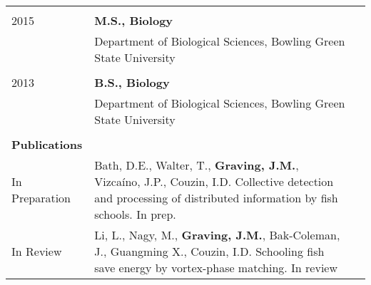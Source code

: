 \documentclass[letterpaper,6pt,oneside]{article}
\begin{document}
\begin{small}
\begin{longtable}{@{} l p{5.3in}l}
     & \\
 \large{2015} 
  & \textbf{M.S., Biology} \\
     & {Department of Biological Sciences, Bowling Green State University} \\
    
     & \\
 \large{2013} 
  &\textbf{B.S., Biology} \\
      & {Department of Biological Sciences, Bowling Green State University} \\
    
     & \\
 \Large{\textbf{Publications}}  \vspace{5mm} \\
\large{In Preparation}
& Bath, D.E., Walter, T., \textbf{Graving, J.M.}, Vizcaíno, J.P., Couzin, I.D. Collective detection and processing of distributed information by fish schools. In prep. \vspace{1mm} \\
\large{In Review}
& Li, L., Nagy, M., \textbf{Graving, J.M.}, Bak-Coleman, J., Guangming X., Couzin, I.D. Schooling fish save energy by vortex-phase matching. In review \vspace{1mm} \\



\end{longtable}
\end{small}
\end{document}
